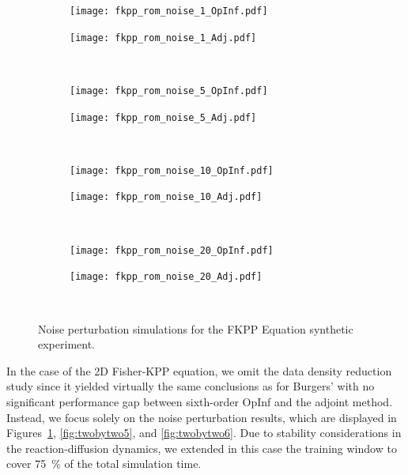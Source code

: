 \begin{figure}[h!]
  \centering
  \begin{subfigure}[c]{0.49\textwidth}
      \centering
      \texttt{[image: fkpp\_rom\_noise\_1\_OpInf.pdf]}
  \end{subfigure}
  \begin{subfigure}[c]{0.49\textwidth}
      \centering
      \texttt{[image: fkpp\_rom\_noise\_1\_Adj.pdf]}
  \end{subfigure} \\[1ex]
    
  \begin{subfigure}[c]{0.49\textwidth}
      \centering
      \texttt{[image: fkpp\_rom\_noise\_5\_OpInf.pdf]}
  \end{subfigure} 
  \begin{subfigure}[c]{0.49\textwidth}
      \centering
      \texttt{[image: fkpp\_rom\_noise\_5\_Adj.pdf]}
  \end{subfigure} \\[1ex]
    
  \begin{subfigure}[c]{0.49\textwidth}
      \centering
      \texttt{[image: fkpp\_rom\_noise\_10\_OpInf.pdf]}
  \end{subfigure} 
  \begin{subfigure}[c]{0.49\textwidth}
      \centering
      \texttt{[image: fkpp\_rom\_noise\_10\_Adj.pdf]}
  \end{subfigure} \\[1ex]
    
  \begin{subfigure}[c]{0.49\textwidth}
      \centering
      \texttt{[image: fkpp\_rom\_noise\_20\_OpInf.pdf]}
  \end{subfigure} 
  \begin{subfigure}[c]{0.49\textwidth}
      \centering
      \texttt{[image: fkpp\_rom\_noise\_20\_Adj.pdf]}
  \end{subfigure} \\[1ex]
  \caption{Noise perturbation simulations for the FKPP Equation synthetic experiment.}
  \label{fig:five_by_two4}
\end{figure}

\newpage


In the case of the 2D Fisher-KPP equation, we omit the data density reduction study since it yielded virtually the same conclusions as for Burgers' with no significant performance gap between sixth-order OpInf and the adjoint method. Instead, we focus solely on the noise perturbation results, which are displayed in Figures~\ref{fig:five_by_two4}, \ref{fig:twobytwo5}, and \ref{fig:twobytwo6}. Due to stability considerations in the reaction-diffusion dynamics, we extended in this case the training window to cover 75~\% of the total simulation time.

